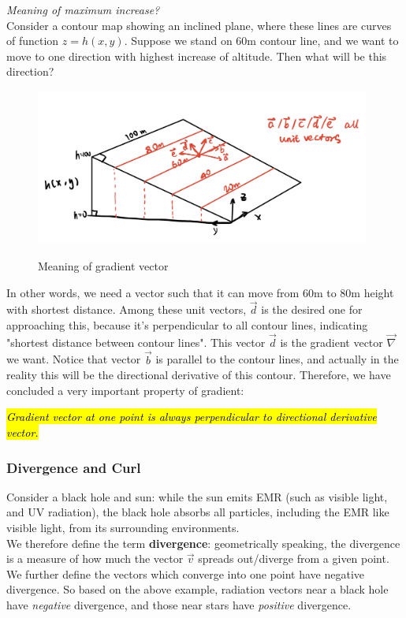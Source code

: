 \documentclass[12pt,a4paper,twoside]{article}
\numberwithin{equation}{section}
\begin{document}
	\noindent \textit{Meaning of maximum increase?}\\
	\noindent Consider a contour map showing an inclined plane, where these lines are curves of function \(z=h(x,y)\). Suppose we stand on 60m contour line, and we want to move to one direction with highest increase of altitude. Then what will be this direction?
	\begin{figure}[h]
		\centering
		\includegraphics[width=11cm]{gradient_meaning.png}
		\label{fig:1}
		\caption{Meaning of gradient vector}
	\end{figure}
	In other words, we need a vector such that it can move from 60m to 80m height with shortest distance. Among these unit vectors, \(\overrightarrow{d}\) is the desired one for approaching this, because it's perpendicular to all contour lines, indicating "shortest distance between contour lines". This vector \(\overrightarrow{d}\) is the gradient vector \(\overrightarrow{\nabla}\) we want. Notice that vector \(\overrightarrow{b}\) is parallel to the contour lines, and actually in the reality this will be the directional derivative of this contour. Therefore, we have concluded a very important property of gradient:
	\begin{center}
		\textit{\hl{Gradient vector at one point is always perpendicular to directional derivative vector.}}
	\end{center}
	
	\subsubsection{Divergence and Curl}
	Consider a black hole and sun: while the sun emits EMR (such as visible light, and UV radiation), the black hole absorbs all particles, including the EMR like visible light, from its surrounding environments. \\
	
	\noindent We therefore define the term \textbf{divergence}: geometrically speaking, the divergence is a measure of how much the vector $\overrightarrow{v}$ spreads out/diverge from a given point. We further define the vectors which converge into one point have negative divergence. So based on the above example, radiation vectors near a black hole have \textit{negative} divergence, and those near stars have \textit{positive} divergence.\\
	
\end{document}
